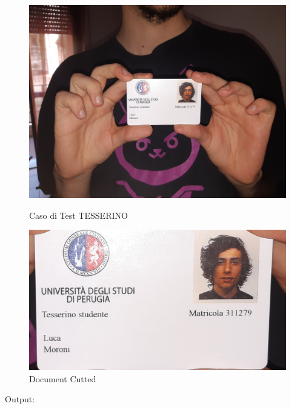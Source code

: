 \documentclass[12pt,a4paper]{article}
\begin{document}
\begin{figure}[!htb]
   \begin{minipage}{0.48\textwidth}
     \centering
     \includegraphics[width=.7\linewidth]{test_tesserino.jpg}
     \caption{Caso di Test TESSERINO}\label{Fig:}
   \end{minipage}\hfill
   \begin{minipage}{0.48\textwidth}
     \centering
     \includegraphics[width=.7\linewidth]{test_tesserino_cutting.jpg}
     \caption{Document Cutted}\label{Fig:}
   \end{minipage}
\end{figure}

Output:
\inputminted{python}{test\_tesserino.py}
\end{document}
